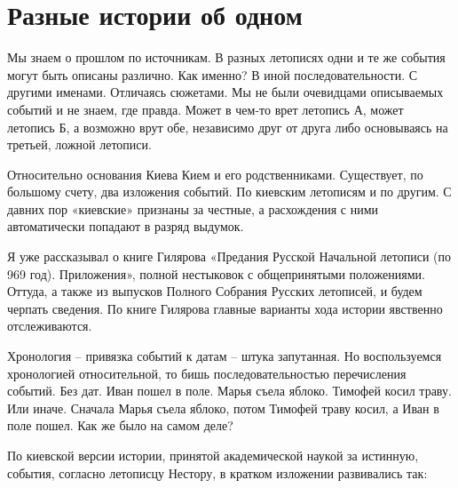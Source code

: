 \chapter{Разные истории об одном}

Мы знаем о прошлом по источникам. В разных летописях одни и те же события могут быть описаны различно. Как именно? В иной последовательности. С другими именами. Отличаясь сюжетами. Мы не были очевидцами описываемых событий и не знаем, где правда. Может в чем-то врет летопись А, может летопись Б, а возможно врут обе, независимо друг от друга либо основываясь на третьей, ложной летописи.

Относительно основания Киева Кием и его родственниками. Существует, по большому счету, два изложения событий. По киевским летописям и по другим. С давних пор «киевские» признаны за честные, а расхождения с ними автоматически попадают в разряд выдумок.

Я уже рассказывал о книге Гилярова «Предания Русской Начальной летописи (по 969 год). Приложения», полной нестыковок с общепринятыми положениями. Оттуда, а также из выпусков Полного Собрания Русских летописей, и будем черпать сведения. По книге Гилярова главные варианты хода истории явственно отслеживаются.

Хронология – привязка событий к датам – штука запутанная. Но воспользуемся хронологией относительной, то бишь последовательностью перечисления событий. Без дат. Иван пошел в поле. Марья съела яблоко. Тимофей косил траву. Или иначе. Сначала Марья съела яблоко, потом Тимофей траву косил, а Иван в поле пошел. Как же было на самом деле?

По киевской версии истории, принятой академической наукой за истинную, события, согласно летописцу Нестору, в кратком изложении развивались так:

